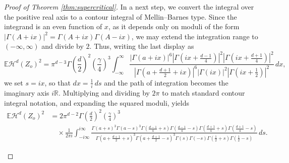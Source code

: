 \documentclass[11pt,a4paper]{article}
\theoremstyle{plain}
\theoremstyle{definition}
\theoremstyle{remark}
\def\EE{\mathbb{E}}
\def\RR{\mathbb{R}}
\def\cH{\mathcal{H}}
\newcommand{\eps}{\varepsilon}
\begin{document}
\begin{proof}[Proof of Theorem \ref{thm:supercritical}]
In a next step, we convert the integral over the positive real axis to a contour integral of Mellin--Barnes type. Since the integrand is an even function of $x$, as it depends only on moduli of the form $|\Gamma(A+ix)|^2=\Gamma(A+ix)\Gamma(A-ix)$, we may extend the integration range to $(-\infty,\infty)$ and divide by $2$. Thus, writing the last display as
\[
\EE\cH^d(Z_o)^2
= \pi^{d-3}\Gamma\left(\frac{d}{2}\right)^2\left(\frac{\gamma}{4}\right)^3
\int_{-\infty}^{\infty}
\frac{\left| \Gamma(a + ix) \right|^6 \left| \Gamma\!\left(ix+\frac{d-1}{4}\right) \right|^2 \left| \Gamma\!\left(ix+\frac{d+1}{4}\right) \right|^2}{
	\left| \Gamma\!\left(a + \frac{d+1}{2} + ix\right) \right|^6 \left| \Gamma(ix) \right|^2 \left| \Gamma\!\left(ix+\frac{1}{2}\right) \right|^2}
\, dx,
\]
we set $s=ix$, so that $dx=\frac{1}{i}\,ds$ and the path of integration becomes the imaginary axis $i\RR$. Multiplying and dividing by $2\pi$ to match standard contour integral notation, and expanding the squared moduli, yields
\begin{align}\label{eq:SecondMomentMellinBarnes_d}
	\nonumber\EE\cH^d(Z_o)^2
	&= 2 \pi^{d-2}\Gamma\left(\frac{d}{2}\right)^2 \left( \frac{\gamma}{4} \right)^3 \\
	&\quad\times\frac{1}{2\pi i}
	\int_{-i\infty}^{i\infty}
	\frac{\Gamma(a+s)^3 \Gamma(a-s)^3 \Gamma(\frac{d-1}{4}+s)\Gamma(\frac{d-1}{4}-s)\Gamma(\frac{d+1}{4}+s)\Gamma(\frac{d+1}{4}-s)}{
		\Gamma(a+\frac{d+1}{2}+s)^3 \Gamma(a+\frac{d+1}{2}-s)^3 \Gamma(s)\Gamma(-s)\Gamma(\frac{1}{2}+s)\Gamma(\frac{1}{2}-s)}
	\, ds.
\end{align}

\begin{figure}[t]
    \centering
\end{figure}
\end{proof}
\end{document}
